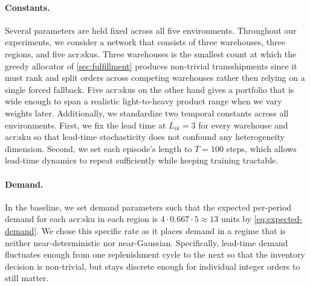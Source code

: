 \paragraph{\textbf{Constants.}} Several parameters are held fixed across all five environments. Throughout our experiments, we consider a network that consists of three warehouses, three regions, and five \glspl{acr:sku}. Three warehouses is the smallest count at which the greedy allocator of \autoref{sec:fulfillment} produces non-trivial transshipments since it must rank and split orders across competing warehouses rather then relying on a single forced fallback. Five \glspl{acr:sku} on the other hand gives a portfolio that is wide enough to span a realistic light-to-heavy product range when we vary weights later. Additionally, we standardize two temporal constants across all environments. First, we fix the lead time at $L_{ik}=3$ for every warehouse and \gls{acr:sku} so that lead-time stochasticity does not confound any heterogeneity dimension. Second, we set each episode's length to $T=100$ steps, which allows lead-time dynamics to repeat sufficiently while keeping training tractable.

\paragraph{\textbf{Demand.}} In the baseline, we set demand parameters such that the expected per-period demand for each \gls{acr:sku} in each region is $4 \cdot 0.667 \cdot 5 \approx 13$ units by \autoref{eq:expected-demand}. We chose this specific rate as it places demand in a regime that is neither near-deterministic nor near-Gaussian. Specifically, lead-time demand fluctuates enough from one replenishment cycle to the next so that the inventory decision is non-trivial, but stays discrete enough for individual integer orders to still matter.

